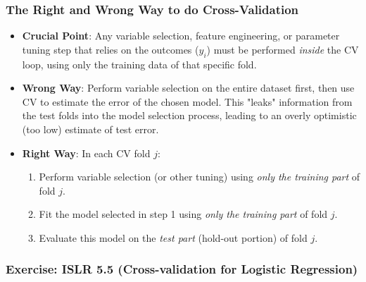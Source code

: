 \documentclass[12pt,a4paper]{article}
\begin{document}
\begin{itemize}
    \subsubsection{The Right and Wrong Way to do Cross-Validation }
        \begin{itemize}
            \item \textbf{Crucial Point}: Any variable selection, feature engineering, or parameter tuning step that relies on the outcomes ($y_i$) must be performed \textit{inside} the CV loop, using only the training data of that specific fold.
            \item \textbf{Wrong Way}: Perform variable selection on the entire dataset first, then use CV to estimate the error of the chosen model. This "leaks" information from the test folds into the model selection process, leading to an overly optimistic (too low) estimate of test error.
            \item \textbf{Right Way}: In each CV fold $j$:
                \begin{enumerate}
                    \item Perform variable selection (or other tuning) using \textit{only the training part} of fold $j$.
                    \item Fit the model selected in step 1 using \textit{only the training part} of fold $j$.
                    \item Evaluate this model on the \textit{test part} (hold-out portion) of fold $j$.
                \end{enumerate}
        \end{itemize}
    \subsubsection{Exercise: ISLR 5.5 (Cross-validation for Logistic Regression)}
        

\end{itemize}
\end{document}
